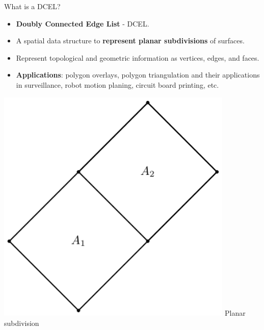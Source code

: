     \begin{frame}{What is a DCEL?}
        \begin{minipage}{0.65\textwidth}
        \begin{itemize}
            \item \textbf{Doubly Connected Edge List} - DCEL.
            \item A spatial data structure to \textbf{represent planar subdivisions} of surfaces.
            \item Represent topological and geometric information as vertices, edges, and faces.
            \item \textbf{Applications}: polygon overlays, polygon triangulation and their applications in surveillance, robot motion planing, circuit board printing, etc.
        \end{itemize}
        \end{minipage}\hfill %
        \begin{minipage}{0.34\textwidth}
            \centering
            \includegraphics[width=0.85\textwidth]{figures/planar_subdivision}
            \tiny{Planar subdivision} \\
            \vspace{0.25cm}

\end{minipage}
\end{frame}
